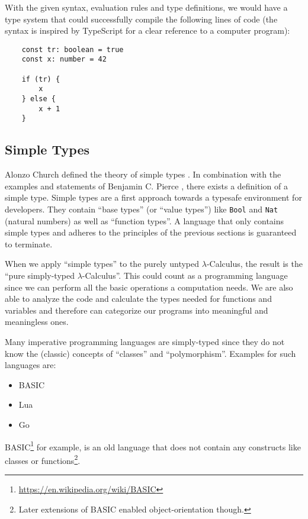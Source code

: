 With the given syntax, evaluation rules and type definitions, we would
have a type system that could successfully compile the following
lines of code (the syntax is inspired by TypeScript for a clear
reference to a computer program):

\begin{verbatim}
    const tr: boolean = true
    const x: number = 42

    if (tr) {
        x
    } else {
        x + 1
    }
\end{verbatim}

\subsection{Simple Types}

Alonzo Church defined the theory of simple types
\cite{churchLogic}. In combination with the examples and
statements of Benjamin C. Pierce \cite{pierce2002ProgLang}, there
exists a definition of a simple type. Simple types are a first
approach towards a typesafe environment for developers. They
contain ``base types'' (or ``value types'') like \texttt{Bool} and
\texttt{Nat} (natural numbers) as well as ``function types''.
A language that only contains simple types and adheres to
the principles of the previous sections is guaranteed to terminate.

When we apply ``simple types'' to the purely untyped
$\lambda$-Calculus, the result is the ``pure simply-typed $\lambda$-Calculus''.
This could count as a programming language since we can perform
all the basic operations a computation needs. We are also able to analyze
the code and calculate the types needed for functions and variables
and therefore can categorize our programs into meaningful and
meaningless ones.

Many imperative programming languages are simply-typed since they do not
know the (classic) concepts of ``classes'' and ``polymorphism''. Examples for such languages
are:

\begin{itemize}
    \item BASIC
    \item Lua
    \item Go
\end{itemize}

BASIC\footnote{\url{https://en.wikipedia.org/wiki/BASIC}} for example, is an
old language that does not contain any constructs like classes or
functions\footnote{Later extensions of BASIC enabled object-orientation though.}.

